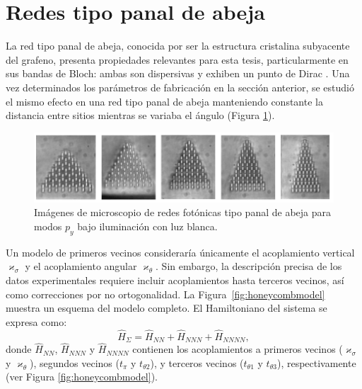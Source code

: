 \section{Redes tipo panal de abeja}
La red tipo panal de abeja, conocida por ser la estructura cristalina subyacente del grafeno, presenta propiedades relevantes para esta tesis, particularmente en sus bandas de Bloch: ambas son dispersivas y exhiben un punto de Dirac \citep{honeycombdirac}. Una vez determinados los parámetros de fabricación en la sección anterior, se estudió el mismo efecto en una red tipo panal de abeja manteniendo constante la distancia entre sitios mientras se variaba el ángulo (Figura \ref{fig:HCLBW}).
\begin{figure}[H]
	\centering
	\includegraphics[width=\linewidth]{media/honeycomb_lattices_bw.png}
	\caption[Imágenes de microscopio de redes fotónicas tipo panal de abeja para modos P]{Imágenes de microscopio de redes fotónicas tipo panal de abeja para modos $p_y$ bajo iluminación con luz blanca. \label{fig:HCLBW}}
\end{figure} \vspace{-3ex} Un modelo de primeros vecinos consideraría únicamente el acoplamiento vertical $\varkappa_\sigma$ y el acoplamiento angular $\varkappa_\theta$. Sin embargo, la descripción precisa de los datos experimentales requiere incluir acoplamientos hasta terceros vecinos, así como correcciones por no ortogonalidad. La Figura~\ref{fig:honeycombmodel} muestra un esquema del modelo completo. El Hamiltoniano del sistema se expresa como:
\begin{equation}
	\hat{H}_\Sigma = \hat{H}_{NN} + \hat{H}_{NNN} + \hat{H}_{NNNN},
\end{equation}
donde $\hat{H}_{NN}$, $\hat{H}_{NNN}$ y $\hat{H}_{NNNN}$ contienen los acoplamientos a primeros vecinos ($\varkappa_\sigma$ y $\varkappa_\theta$), segundos vecinos ($t_\pi$ y $t_{\theta 2}$), y terceros vecinos ($t_{\theta 1}$ y $t_{\theta 3}$), respectivamente (ver Figura \ref{fig:honeycombmodel}).

